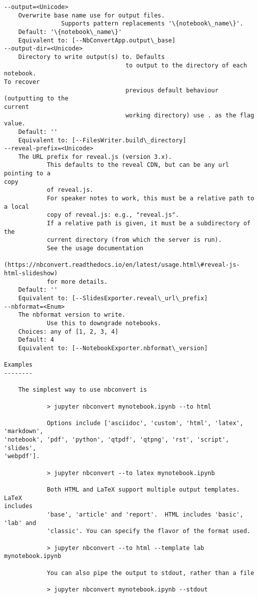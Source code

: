 \documentclass[11pt]{article}
\begin{document}
\begin{Verbatim}[commandchars=\\\{\}]
--output=<Unicode>
    Overwrite base name use for output files.
                Supports pattern replacements '\{notebook\_name\}'.
    Default: '\{notebook\_name\}'
    Equivalent to: [--NbConvertApp.output\_base]
--output-dir=<Unicode>
    Directory to write output(s) to. Defaults
                                  to output to the directory of each notebook.
To recover
                                  previous default behaviour (outputting to the
current
                                  working directory) use . as the flag value.
    Default: ''
    Equivalent to: [--FilesWriter.build\_directory]
--reveal-prefix=<Unicode>
    The URL prefix for reveal.js (version 3.x).
            This defaults to the reveal CDN, but can be any url pointing to a
copy
            of reveal.js.
            For speaker notes to work, this must be a relative path to a local
            copy of reveal.js: e.g., "reveal.js".
            If a relative path is given, it must be a subdirectory of the
            current directory (from which the server is run).
            See the usage documentation
            (https://nbconvert.readthedocs.io/en/latest/usage.html\#reveal-js-
html-slideshow)
            for more details.
    Default: ''
    Equivalent to: [--SlidesExporter.reveal\_url\_prefix]
--nbformat=<Enum>
    The nbformat version to write.
            Use this to downgrade notebooks.
    Choices: any of [1, 2, 3, 4]
    Default: 4
    Equivalent to: [--NotebookExporter.nbformat\_version]

Examples
--------

    The simplest way to use nbconvert is

            > jupyter nbconvert mynotebook.ipynb --to html

            Options include ['asciidoc', 'custom', 'html', 'latex', 'markdown',
'notebook', 'pdf', 'python', 'qtpdf', 'qtpng', 'rst', 'script', 'slides',
'webpdf'].

            > jupyter nbconvert --to latex mynotebook.ipynb

            Both HTML and LaTeX support multiple output templates. LaTeX
includes
            'base', 'article' and 'report'.  HTML includes 'basic', 'lab' and
            'classic'. You can specify the flavor of the format used.

            > jupyter nbconvert --to html --template lab mynotebook.ipynb

            You can also pipe the output to stdout, rather than a file

            > jupyter nbconvert mynotebook.ipynb --stdout


\end{Verbatim}
\end{document}
